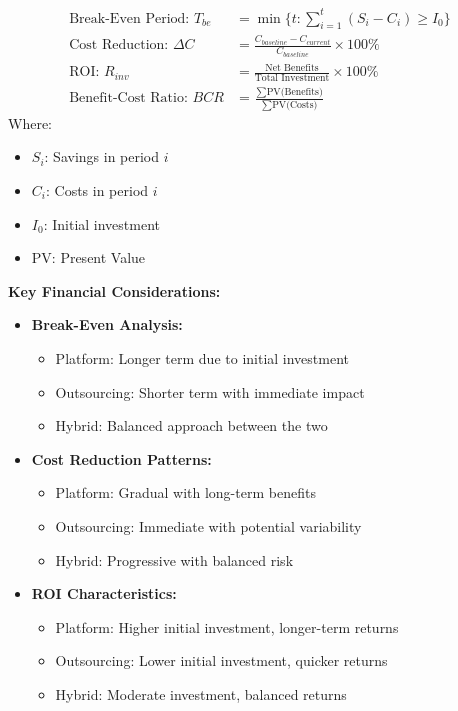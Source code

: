 \documentclass[12pt,a4paper]{article}
\newenvironment{definition}[1]
{\begin{mdframed}[style=definitionstyle,frametitle={Definition: #1}]}
{\end{mdframed}}
\newenvironment{observation}
{\begin{mdframed}[style=observationstyle,frametitle={Observation}]}
{\end{mdframed}}
\begin{document}
\begin{definition}{Financial Performance Metrics}
\begin{align*}
    \text{Break-Even Period: } T_{be} &= \min\{t : \sum_{i=1}^t (S_i - C_i) \geq I_0\} \\[1em]
    \text{Cost Reduction: } \Delta C &= \frac{C_{baseline} - C_{current}}{C_{baseline}} \times 100\% \\[1em]
    \text{ROI: } R_{inv} &= \frac{\text{Net Benefits}}{\text{Total Investment}} \times 100\% \\[1em]
    \text{Benefit-Cost Ratio: } BCR &= \frac{\sum \text{PV(Benefits)}}{\sum \text{PV(Costs)}}
\end{align*}
Where:
\begin{itemize}
    \item $S_i$: Savings in period $i$
    \item $C_i$: Costs in period $i$
    \item $I_0$: Initial investment
    \item PV: Present Value
\end{itemize}
\end{definition}

\begin{observation}
\textbf{Key Financial Considerations:}
\begin{itemize}
    \item \textbf{Break-Even Analysis:}
        \begin{itemize}
            \item Platform: Longer term due to initial investment
            \item Outsourcing: Shorter term with immediate impact
            \item Hybrid: Balanced approach between the two
        \end{itemize}
    \item \textbf{Cost Reduction Patterns:}
        \begin{itemize}
            \item Platform: Gradual with long-term benefits
            \item Outsourcing: Immediate with potential variability
            \item Hybrid: Progressive with balanced risk
        \end{itemize}
    \item \textbf{ROI Characteristics:}
        \begin{itemize}
            \item Platform: Higher initial investment, longer-term returns
            \item Outsourcing: Lower initial investment, quicker returns
            \item Hybrid: Moderate investment, balanced returns
        \end{itemize}
\end{itemize}
\end{observation}
\end{document}
